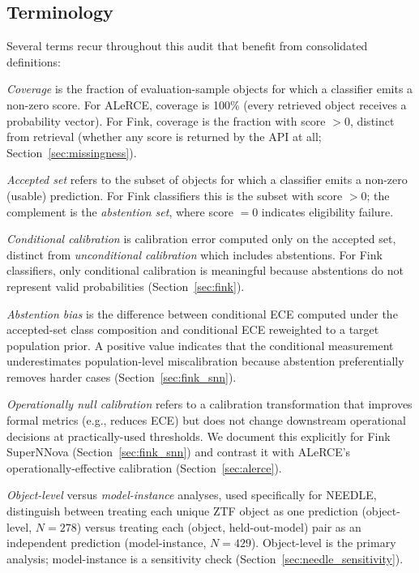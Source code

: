 \documentclass[twocolumn]{aastex631}
\begin{document}
\subsection{Terminology}
\label{sec:terminology}

Several terms recur throughout this audit that benefit from consolidated
definitions:

\textit{Coverage} is the fraction of evaluation-sample objects for which
a classifier emits a non-zero score. For ALeRCE, coverage is 100\%
(every retrieved object receives a probability vector). For Fink,
coverage is the fraction with score $> 0$, distinct from retrieval
(whether any score is returned by the API at all;
Section~\ref{sec:missingness}).

\textit{Accepted set} refers to the subset of objects for which a
classifier emits a non-zero (usable) prediction. For Fink classifiers
this is the subset with score $> 0$; the complement is the
\textit{abstention set}, where score $= 0$ indicates eligibility
failure.

\textit{Conditional calibration} is calibration error computed only on
the accepted set, distinct from \textit{unconditional calibration} which
includes abstentions. For Fink classifiers, only conditional calibration
is meaningful because abstentions do not represent valid probabilities
(Section~\ref{sec:fink}).

\textit{Abstention bias} is the difference between conditional ECE
computed under the accepted-set class composition and conditional ECE
reweighted to a target population prior. A positive value indicates
that the conditional measurement underestimates population-level
miscalibration because abstention preferentially removes harder cases
(Section~\ref{sec:fink_snn}).

\textit{Operationally null calibration} refers to a calibration
transformation that improves formal metrics (e.g., reduces ECE) but
does not change downstream operational decisions at practically-used
thresholds. We document this explicitly for Fink SuperNNova
(Section~\ref{sec:fink_snn}) and contrast it with ALeRCE's
operationally-effective calibration (Section~\ref{sec:alerce}).

\textit{Object-level} versus \textit{model-instance} analyses, used
specifically for NEEDLE, distinguish between treating each unique ZTF
object as one prediction (object-level, $N = 278$) versus treating each
(object, held-out-model) pair as an independent prediction
(model-instance, $N = 429$). Object-level is the primary analysis;
model-instance is a sensitivity check
(Section~\ref{sec:needle_sensitivity}).
\end{document}
